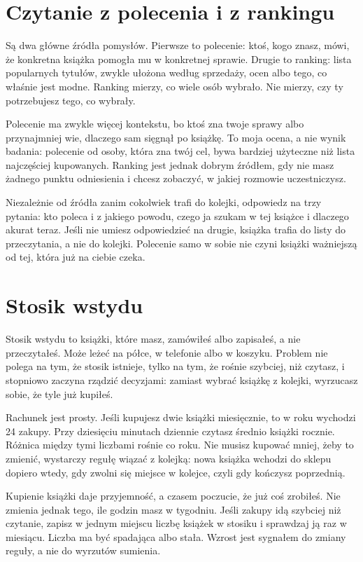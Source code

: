 \section{Czytanie z polecenia i z rankingu}

Są dwa główne źródła pomysłów. Pierwsze to polecenie: ktoś, kogo znasz, mówi, że konkretna książka pomogła mu w konkretnej sprawie. Drugie to ranking: lista popularnych tytułów, zwykle ułożona według sprzedaży, ocen albo tego, co właśnie jest modne. Ranking mierzy, co wiele osób wybrało. Nie mierzy, czy ty potrzebujesz tego, co wybrały.

Polecenie ma zwykle więcej kontekstu, bo ktoś zna twoje sprawy albo przynajmniej wie, dlaczego sam sięgnął po książkę. To moja ocena, a nie wynik badania: polecenie od osoby, która zna twój cel, bywa bardziej użyteczne niż lista najczęściej kupowanych. Ranking jest jednak dobrym źródłem, gdy nie masz żadnego punktu odniesienia i chcesz zobaczyć, w jakiej rozmowie uczestniczysz.

Niezależnie od źródła zanim cokolwiek trafi do kolejki, odpowiedz na trzy pytania: kto poleca i z jakiego powodu, czego ja szukam w tej książce i dlaczego akurat teraz. Jeśli nie umiesz odpowiedzieć na drugie, książka trafia do listy do przeczytania, a nie do kolejki. Polecenie samo w sobie nie czyni książki ważniejszą od tej, która już na ciebie czeka.

\section{Stosik wstydu}

Stosik wstydu to książki, które masz, zamówiłeś albo zapisałeś, a nie przeczytałeś. Może leżeć na półce, w telefonie albo w koszyku. Problem nie polega na tym, że stosik istnieje, tylko na tym, że rośnie szybciej, niż czytasz, i stopniowo zaczyna rządzić decyzjami: zamiast wybrać książkę z kolejki, wyrzucasz sobie, że tyle już kupiłeś.

Rachunek jest prosty. Jeśli kupujesz dwie książki miesięcznie, to w roku wychodzi 24 zakupy. Przy dziesięciu minutach dziennie czytasz średnio  książki rocznie. Różnica między tymi liczbami rośnie co roku. Nie musisz kupować mniej, żeby to zmienić, wystarczy regułę wiązać z kolejką: nowa książka wchodzi do sklepu dopiero wtedy, gdy zwolni się miejsce w kolejce, czyli gdy kończysz poprzednią.

\begin{uwaga}
  Kupienie książki daje przyjemność, a czasem poczucie, że już coś zrobiłeś. Nie zmienia jednak tego, ile godzin masz w tygodniu. Jeśli zakupy idą szybciej niż czytanie, zapisz w jednym miejscu liczbę książek w stosiku i sprawdzaj ją raz w miesiącu. Liczba ma być spadająca albo stała. Wzrost jest sygnałem do zmiany reguły, a nie do wyrzutów sumienia.
\end{uwaga}

